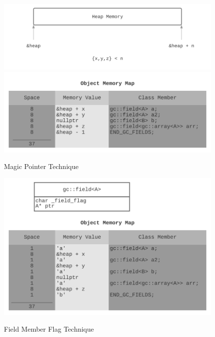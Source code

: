 \documentclass[11pt]{article}
\begin{document}
\begin{figure}
\begin{center}
\includegraphics[scale=0.5]{./report_srcs/heap_memory_only.png}
\includegraphics[scale=0.5]{./report_srcs/magic_pointer_technique.png}
\caption{Magic Pointer Technique}
\label{fig:mark:magicpointer}
\includegraphics[scale=0.5]{./report_srcs/field_member_flag_technique.png}
\caption{Field Member Flag Technique}
\label{fig:mark:fieldmemberflag}
\end{center}
\end{figure}
\end{document}
